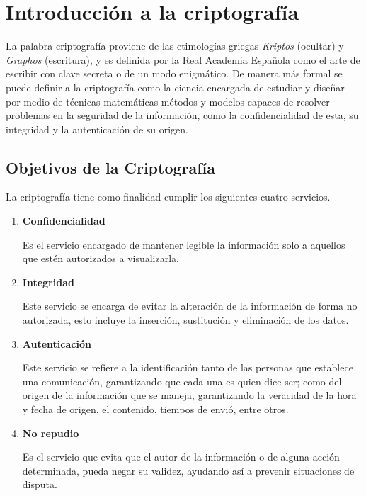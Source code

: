 %
%

\section{Introducción a la criptografía}

La palabra criptografía proviene de las etimologías griegas \textit{Kriptos}
(ocultar) y \textit{Graphos} (escritura), y es definida por la Real Academia
Española como el arte de escribir con clave secreta o de un modo enigmático.
De manera más formal se puede definir a la criptografía como la ciencia
encargada de estudiar y diseñar por medio de técnicas matemáticas métodos y
modelos capaces de resolver problemas en la seguridad de la información, como
la confidencialidad de esta, su integridad y la autenticación de su origen.

  \subsection{Objetivos de la Criptografía}

    La criptografía tiene como finalidad cumplir los siguientes cuatro
    servicios.

    \begin{enumerate}

      \item \textbf{Confidencialidad}

        Es el servicio encargado de mantener legible la información solo a
        aquellos que estén autorizados a visualizarla.

      \item \textbf{Integridad}

        Este servicio se encarga de evitar la alteración de la información de
        forma no autorizada, esto incluye la inserción, sustitución y
        eliminación de los datos.

      \item \textbf{Autenticación}

        Este servicio se refiere a la identificación tanto de las personas que
        establece una comunicación, garantizando que cada una es quien dice
        ser; como del origen de la información que se maneja, garantizando la
        veracidad de la hora y fecha de origen, el contenido, tiempos de
        envió, entre otros.

      \item \textbf{No repudio}

        Es el servicio que evita que el autor de la información o de alguna
        acción determinada, pueda negar su validez, ayudando así a prevenir
        situaciones de disputa.

    \end{enumerate}

